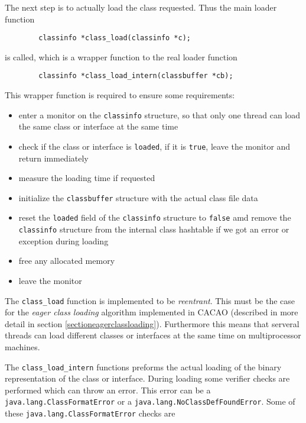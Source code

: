 The next step is to actually load the class requested. Thus the main
loader function

\begin{verbatim}
        classinfo *class_load(classinfo *c);
\end{verbatim}

is called, which is a wrapper function to the real loader function

\begin{verbatim}
        classinfo *class_load_intern(classbuffer *cb);
\end{verbatim}

This wrapper function is required to ensure some requirements:

\begin{itemize}
 \item enter a monitor on the \texttt{classinfo} structure, so that
 only one thread can load the same class or interface at the same time

 \item check if the class or interface is \texttt{loaded}, if it is
 \texttt{true}, leave the monitor and return immediately

 \item measure the loading time if requested

 \item initialize the \texttt{classbuffer} structure with the actual
 class file data

 \item reset the \texttt{loaded} field of the \texttt{classinfo}
 structure to \texttt{false} amd remove the \texttt{classinfo}
 structure from the internal class hashtable if we got an error or
 exception during loading

 \item free any allocated memory

 \item leave the monitor
\end{itemize}

The \texttt{class\_load} function is implemented to be
\textit{reentrant}. This must be the case for the \textit{eager class
loading} algorithm implemented in CACAO (described in more detail in
section \ref{sectioneagerclassloading}). Furthermore this means that
serveral threads can load different classes or interfaces at the same
time on multiprocessor machines.

The \texttt{class\_load\_intern} functions preforms the actual loading
of the binary representation of the class or interface. During loading
some verifier checks are performed which can throw an error. This
error can be a \texttt{java.lang.ClassFormatError} or a
\texttt{java.lang.NoClassDefFoundError}. Some of these
\texttt{java.lang.ClassFormatError} checks are

